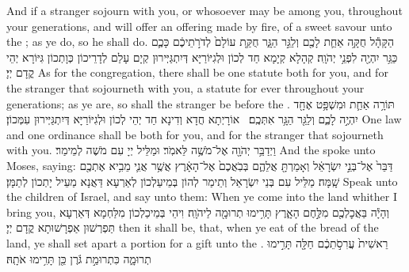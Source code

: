 {And if a stranger sojourn with you, or whosoever may be among you, throughout your generations, and will offer an offering made by fire, of a sweet savour unto the \lord; as ye do, so he shall do.}{}
{הַקָּהָ֕ל חֻקָּ֥ה אַחַ֛ת לָכֶ֖ם וְלַגֵּ֣ר הַגָּ֑ר חֻקַּ֤ת עוֹלָם֙ לְדֹרֹ֣תֵיכֶ֔ם כָּכֶ֛ם כַּגֵּ֥ר יִהְיֶ֖ה לִפְנֵ֥י יְהֹוָֽה׃
}
{קְהָלָא קְיָמָא חַד לְכוֹן וּלְגִיּוֹרַיָּא דְּיִתְגַּיְּירוּן קְיָם עָלַם לְדָרֵיכוֹן כְּוָתְכוֹן גִּיּוֹרָא יְהֵי קֳדָם יְיָ׃}
{As for the congregation, there shall be one statute both for you, and for the stranger that sojourneth with you, a statute for ever throughout your generations; as ye are, so shall the stranger be before the \lord.}{}
{תּוֹרָ֥ה אַחַ֛ת וּמִשְׁפָּ֥ט אֶחָ֖ד יִהְיֶ֣ה לָכֶ֑ם וְלַגֵּ֖ר הַגָּ֥ר אִתְּכֶֽם׃ \petucha }
{אוֹרָיְתָא חֲדָא וְדִינָא חַד יְהֵי לְכוֹן וּלְגִיּוֹרַיָּא דְּיִתְגַּיְּירוּן עִמְּכוֹן׃}
{One law and one ordinance shall be both for you, and for the stranger that sojourneth with you.}{}
{וַיְדַבֵּ֥ר יְהֹוָ֖ה אֶל־מֹשֶׁ֥ה לֵּאמֹֽר׃}
{וּמַלֵּיל יְיָ עִם מֹשֶׁה לְמֵימַר׃}
{And the \lord\space spoke unto Moses, saying:}{}
{דַּבֵּר֙ אֶל־בְּנֵ֣י יִשְׂרָאֵ֔ל וְאָמַרְתָּ֖ אֲלֵהֶ֑ם בְּבֹֽאֲכֶם֙ אֶל־הָאָ֔רֶץ אֲשֶׁ֥ר אֲנִ֛י מֵבִ֥יא אֶתְכֶ֖ם שָֽׁמָּה׃
}
{מַלֵּיל עִם בְּנֵי יִשְׂרָאֵל וְתֵימַר לְהוֹן בְּמֵיעַלְכוֹן לְאַרְעָא דַּאֲנָא מַעֵיל יָתְכוֹן לְתַמָּן׃}
{Speak unto the children of Israel, and say unto them: When ye come into the land whither I bring you,}{}
{וְהָיָ֕ה בַּאֲכׇלְכֶ֖ם מִלֶּ֣חֶם הָאָ֑רֶץ תָּרִ֥ימוּ תְרוּמָ֖ה לַיהֹוָֽה׃}
{וִיהֵי בְּמֵיכַלְכוֹן מִלַּחְמָא דְּאַרְעָא תַּפְרְשׁוּן אַפְרָשׁוּתָא קֳדָם יְיָ׃}
{then it shall be, that, when ye eat of the bread of the land, ye shall set apart a portion for a gift unto the \lord.}{}
{רֵאשִׁית֙ עֲרִסֹ֣תֵכֶ֔ם חַלָּ֖ה תָּרִ֣ימוּ תְרוּמָ֑ה כִּתְרוּמַ֣ת גֹּ֔רֶן כֵּ֖ן תָּרִ֥ימוּ אֹתָֽהּ׃
}
